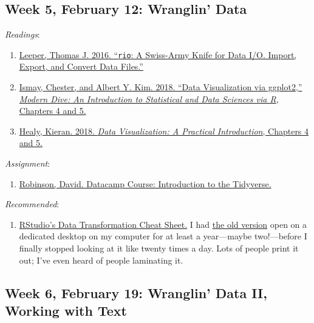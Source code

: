 \documentclass[]{article}
\providecommand{\tightlist}{%
  \setlength{\itemsep}{0pt}\setlength{\parskip}{0pt}}
\begin{document}
\hypertarget{week-5-february-12-wranglin-data}{%
\subsection{Week 5, February 12: Wranglin'
Data}\label{week-5-february-12-wranglin-data}}

\emph{Readings}:

\begin{enumerate}
\def\labelenumi{\arabic{enumi}.}
\tightlist
\item
  \href{https://cran.r-project.org/web/packages/rio/vignettes/rio.html}{Leeper,
  Thomas J. 2016. ``\texttt{rio}: A Swiss-Army Knife for Data I/O.
  Import, Export, and Convert Data Files.''}
\item
  \href{https://moderndive.com/4-tidy.html}{Ismay, Chester, and Albert
  Y. Kim. 2018. ``Data Visualization via ggplot2,'' \emph{Modern Dive:
  An Introduction to Statistical and Data Sciences via R}, Chapters 4
  and 5.}
\item
  \href{https://socviz.co/groupfacettx.html}{Healy, Kieran. 2018.
  \emph{Data Visualization: A Practical Introduction}, Chapters 4 and
  5.}
\end{enumerate}

\emph{Assignment}:

\begin{enumerate}
\def\labelenumi{\arabic{enumi}.}
\tightlist
\item
  \href{https://www.datacamp.com/courses/introduction-to-the-tidyverse}{Robinson,
  David. Datacamp Course: Introduction to the Tidyverse.}
\end{enumerate}

\emph{Recommended}:

\begin{enumerate}
\def\labelenumi{\arabic{enumi}.}
\tightlist
\item
  \href{https://github.com/rstudio/cheatsheets/raw/master/data-transformation.pdf}{RStudio's
  Data Transformation Cheat Sheet.} I had
  \href{https://www.rstudio.com/wp-content/uploads/2015/02/data-wrangling-cheatsheet.pdf}{the
  old version} open on a dedicated desktop on my computer for at least a
  year---maybe two!---before I finally stopped looking at it like twenty
  times a day. Lots of people print it out; I've even heard of people
  laminating it.
\end{enumerate}

\hypertarget{week-6-february-19-wranglin-data-ii-working-with-text}{%
\subsection{Week 6, February 19: Wranglin' Data II, Working with
Text}\label{week-6-february-19-wranglin-data-ii-working-with-text}}
\end{document}
